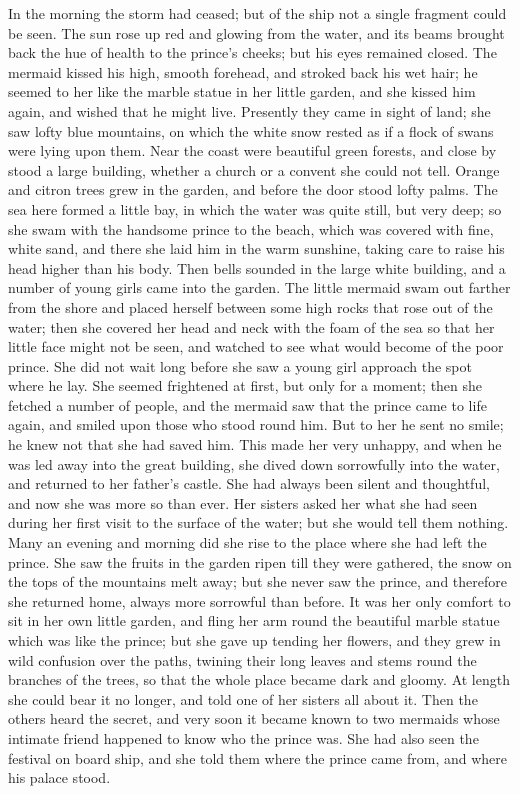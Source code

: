 In the morning the storm had ceased; but of the ship not a single fragment could be seen.
The sun rose up red and glowing from the water, and its beams brought back the hue of health to the prince’s cheeks; but his eyes remained closed.
The mermaid kissed his high, smooth forehead, and stroked back his wet hair; he seemed to her like the marble statue in her little garden, and she kissed him again, and wished that he might live.
Presently they came in sight of land; she saw lofty blue mountains, on which the white snow rested as if a flock of swans were lying upon them.
Near the coast were beautiful green forests, and close by stood a large building, whether a church or a convent she could not tell.
Orange and citron trees grew in the garden, and before the door stood lofty palms.
The sea here formed a little bay, in which the water was quite still, but very deep; so she swam with the handsome prince to the beach, which was covered with fine, white sand, and there she laid him in the warm sunshine, taking care to raise his head higher than his body.
Then bells sounded in the large white building, and a number of young girls came into the garden.
The little mermaid swam out farther from the shore and placed herself between some high rocks that rose out of the water; then she covered her head and neck with the foam of the sea so that her little face might not be seen, and watched to see what would become of the poor prince.
She did not wait long before she saw a young girl approach the spot where he lay.
She seemed frightened at first, but only for a moment; then she fetched a number of people, and the mermaid saw that the prince came to life again, and smiled upon those who stood round him.
But to her he sent no smile; he knew not that she had saved him.
This made her very unhappy, and when he was led away into the great building, she dived down sorrowfully into the water, and returned to her father’s castle.
She had always been silent and thoughtful, and now she was more so than ever.
Her sisters asked her what she had seen during her first visit to the surface of the water; but she would tell them nothing.
Many an evening and morning did she rise to the place where she had left the prince.
She saw the fruits in the garden ripen till they were gathered, the snow on the tops of the mountains melt away; but she never saw the prince, and therefore she returned home, always more sorrowful than before.
It was her only comfort to sit in her own little garden, and fling her arm round the beautiful marble statue which was like the prince; but she gave up tending her flowers, and they grew in wild confusion over the paths, twining their long leaves and stems round the branches of the trees, so that the whole place became dark and gloomy.
At length she could bear it no longer, and told one of her sisters all about it.
Then the others heard the secret, and very soon it became known to two mermaids whose intimate friend happened to know who the prince was.
She had also seen the festival on board ship, and she told them where the prince came from, and where his palace stood.

